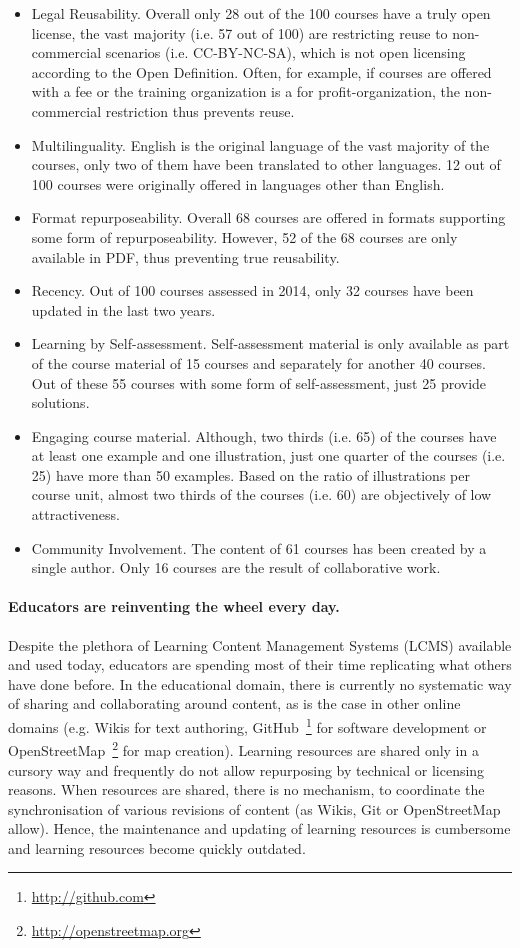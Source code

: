 \documentclass[ngerman,UKenglish,table]{scrbook}
\begin{document}
\begin{itemize}
\item{Legal Reusability.} Overall only 28 out of the 100 courses have a truly open license, the vast majority (i.e. 57 out of 100) are restricting reuse to non-commercial scenarios (i.e. CC-BY-NC-SA), which is not open licensing according to the Open Definition.
Often, for example, if courses are offered with a fee or the training organization is a for profit-organization, the non-commercial restriction thus prevents reuse.
\item{Multilinguality.} English is the original language of the vast majority of the courses, only two of them have been translated to other languages.
12 out of 100 courses were originally offered in languages other than English. 
\item{Format repurposeability.} Overall 68 courses are offered in formats supporting some form of repurposeability. However, 52 of the 68 courses are only available in PDF, thus preventing true reusability.
\item{Recency.} Out of 100 courses assessed in 2014, only 32 courses have been updated in the last two years.
\item{Learning by Self-assessment.} Self-assessment material is only available as part of the course material of 15 courses and separately for another 40 courses.
Out of these 55 courses with some form of self-assessment, just 25 provide solutions.
\item{Engaging course material.} Although, two thirds (i.e. 65) of the courses have at least one example and one illustration, just one quarter of the courses (i.e. 25) have more than 50 examples.
Based on the ratio of illustrations per course unit, almost two thirds of the courses (i.e. 60) are objectively of low attractiveness.
\item{Community Involvement.} The content of 61 courses has been created by a single author. Only 16 courses are the result of collaborative work.
\end{itemize}

\paragraph{Educators are reinventing the wheel every day.}
Despite the plethora of Learning Content Management Systems (LCMS) available and used today, educators are spending most of their time replicating what others have done before.
In the educational domain, there is currently no systematic way of sharing and collaborating around content, as is the case in other online domains (e.g. Wikis for text authoring, GitHub~\footnote{\url{http://github.com}} for software development or OpenStreetMap~\footnote{\url{http://openstreetmap.org}} for map creation).
Learning resources are shared only in a cursory way and frequently do not allow repurposing by technical or licensing reasons.
When resources are shared, there is no mechanism, to coordinate the synchronisation of various revisions of content (as Wikis, Git or OpenStreetMap allow).
Hence, the maintenance and updating of learning resources is cumbersome and learning resources become quickly outdated.
\end{document}
